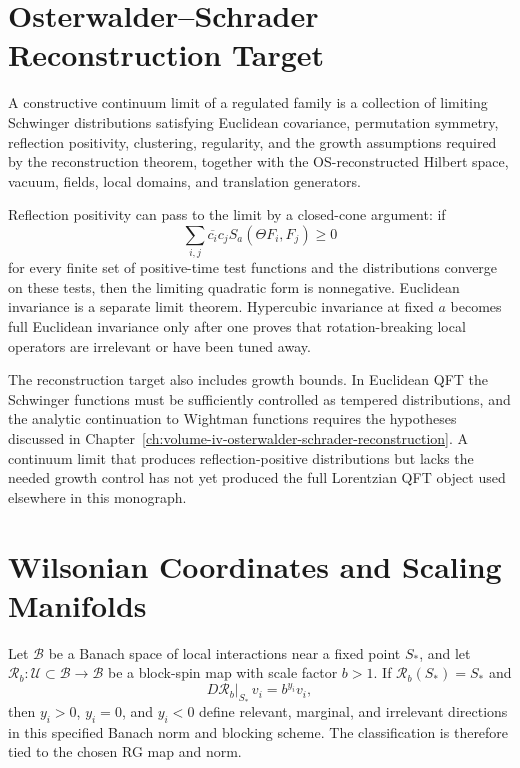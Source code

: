 \section{Osterwalder--Schrader Reconstruction Target}

\begin{definition}
\label{def:constructive-continuum-limit}
A constructive continuum limit of a regulated family is a collection of
limiting Schwinger distributions satisfying Euclidean covariance,
permutation symmetry, reflection positivity, clustering, regularity, and the
growth assumptions required by the reconstruction theorem, together with the
OS-reconstructed Hilbert space, vacuum, fields, local domains, and
translation generators.
\end{definition}

Reflection positivity can pass to the limit by a closed-cone argument: if
\[
  \sum_{i,j}\overline{c_i}c_j
  S_{a}(\Theta F_i,F_j)\ge0
\]
for every finite set of positive-time test functions and the distributions
converge on these tests, then the limiting quadratic form is nonnegative.
Euclidean invariance is a separate limit theorem.  Hypercubic invariance at
fixed \(a\) becomes full Euclidean invariance only after one proves that
rotation-breaking local operators are irrelevant or have been tuned away.

The reconstruction target also includes growth bounds.  In Euclidean QFT the
Schwinger functions must be sufficiently controlled as tempered
distributions, and the analytic continuation to Wightman functions requires
the hypotheses discussed in
Chapter~\ref{ch:volume-iv-osterwalder-schrader-reconstruction}.  A continuum limit that
produces reflection-positive distributions but lacks the needed growth
control has not yet produced the full Lorentzian QFT object used elsewhere
in this monograph.

\section{Wilsonian Coordinates and Scaling Manifolds}

Let \(\mathcal B\) be a Banach space of local interactions near a fixed point
\(S_*\), and let \(\mathcal R_b:\mathcal U\subset\mathcal B\to\mathcal B\)
be a block-spin map with scale factor \(b>1\).  If \(\mathcal R_b(S_*)=S_*\)
and
\[
  D\mathcal R_b|_{S_*}\,v_i=b^{y_i}v_i ,
\]
then \(y_i>0\), \(y_i=0\), and \(y_i<0\) define relevant, marginal, and
irrelevant directions in this specified Banach norm and blocking scheme.
The classification is therefore tied to the chosen RG map and norm.

